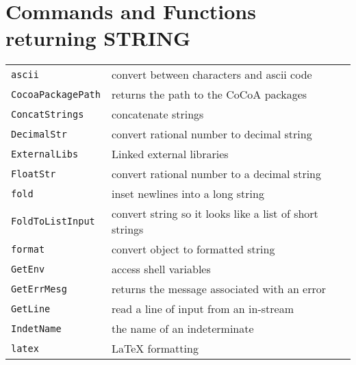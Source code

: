 \documentclass[a4paper]{mybook}
\begin{document}
\noindent



\section{Commands and Functions returning STRING}
\label{Commands and Functions returning STRING}

        

\begin{center}
\begin{longtable}{ll}
   
{\verb~ascii~} &
      convert between characters and ascii code\\
   
{\verb~CocoaPackagePath~} &
      returns the path to the CoCoA packages\\
   
{\verb~ConcatStrings~} &
      concatenate strings\\
   
{\verb~DecimalStr~} &
      convert rational number to decimal string\\
   
{\verb~ExternalLibs~} &
      Linked external libraries\\
   
{\verb~FloatStr~} &
      convert rational number to a decimal string\\
   
{\verb~fold~} &
      inset newlines into a long string\\
   
{\verb~FoldToListInput~} &
      convert string so it looks like a list of short strings\\
   
{\verb~format~} &
      convert object to formatted string\\
   
{\verb~GetEnv~} &
      access shell variables\\
   
{\verb~GetErrMesg~} &
      returns the message associated with an error\\
   
{\verb~GetLine~} &
      read a line of input from an in-stream\\
   
{\verb~IndetName~} &
      the name of an indeterminate\\
   
{\verb~latex~} &
      LaTeX formatting\\
   

\end{longtable}
\end{center}
\end{document}
